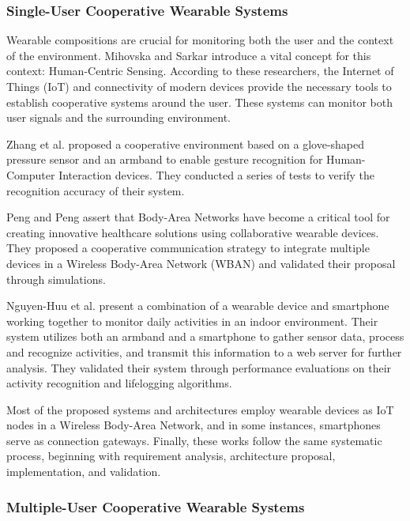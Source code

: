 \subsubsection{Single-User Cooperative Wearable Systems}

Wearable compositions are crucial for monitoring both the user and the context of the environment. Mihovska and Sarkar \cite{mihovska2018cooperative} introduce a vital concept for this context: Human-Centric Sensing. According to these researchers, the Internet of Things (IoT) and connectivity of modern devices provide the necessary tools to establish cooperative systems around the user. These systems can monitor both user signals and the surrounding environment.

Zhang et al. \cite{zhang2019cooperative} proposed a cooperative environment based on a glove-shaped pressure sensor and an armband to enable gesture recognition for Human-Computer Interaction devices. They conducted a series of tests to verify the recognition accuracy of their system.

Peng and Peng \cite{peng2016cooperative} assert that Body-Area Networks have become a critical tool for creating innovative healthcare solutions using collaborative wearable devices. They proposed a cooperative communication strategy to integrate multiple devices in a Wireless Body-Area Network (WBAN) and validated their proposal through simulations.

Nguyen-Huu et al. \cite{nguyen2018smartwatch} present a combination of a wearable device and smartphone working together to monitor daily activities in an indoor environment. Their system utilizes both an armband and a smartphone to gather sensor data, process and recognize activities, and transmit this information to a web server for further analysis. They validated their system through performance evaluations on their activity recognition and lifelogging algorithms.

Most of the proposed systems and architectures employ wearable devices as IoT nodes in a Wireless Body-Area Network, and in some instances, smartphones serve as connection gateways. Finally, these works follow the same systematic process, beginning with requirement analysis, architecture proposal, implementation, and validation.

\subsubsection{Multiple-User Cooperative Wearable Systems}
\label{subsec: MUCWS}

